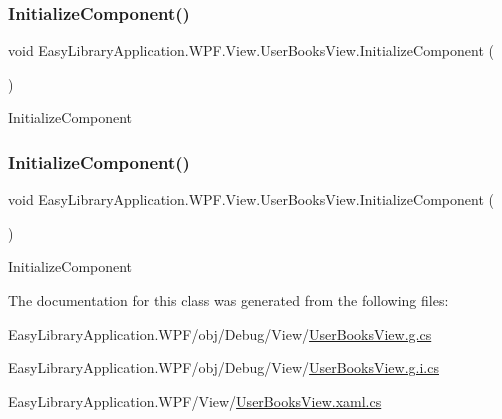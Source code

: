 \subsubsection{\texorpdfstring{Initialize\+Component()}{InitializeComponent()}\hspace{0.1cm}{\footnotesize\ttfamily [1/2]}}
{\footnotesize\ttfamily void Easy\+Library\+Application.\+W\+P\+F.\+View.\+User\+Books\+View.\+Initialize\+Component (\begin{DoxyParamCaption}{ }\end{DoxyParamCaption})}



Initialize\+Component 

\mbox{\label{class_easy_library_application_1_1_w_p_f_1_1_view_1_1_user_books_view_ae259878231726e06fa843e6c7f91c9c1}} 
\subsubsection{\texorpdfstring{Initialize\+Component()}{InitializeComponent()}\hspace{0.1cm}{\footnotesize\ttfamily [2/2]}}
{\footnotesize\ttfamily void Easy\+Library\+Application.\+W\+P\+F.\+View.\+User\+Books\+View.\+Initialize\+Component (\begin{DoxyParamCaption}{ }\end{DoxyParamCaption})}



Initialize\+Component 



The documentation for this class was generated from the following files\+:\begin{DoxyCompactItemize}
\item 
Easy\+Library\+Application.\+W\+P\+F/obj/\+Debug/\+View/\mbox{\hyperlink{_user_books_view_8g_8cs}{User\+Books\+View.\+g.\+cs}}\item 
Easy\+Library\+Application.\+W\+P\+F/obj/\+Debug/\+View/\mbox{\hyperlink{_user_books_view_8g_8i_8cs}{User\+Books\+View.\+g.\+i.\+cs}}\item 
Easy\+Library\+Application.\+W\+P\+F/\+View/\mbox{\hyperlink{_user_books_view_8xaml_8cs}{User\+Books\+View.\+xaml.\+cs}}\end{DoxyCompactItemize}
